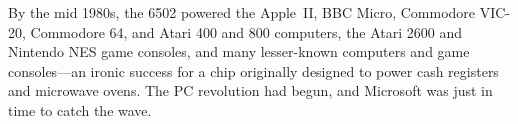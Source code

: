 By the mid 1980s, the 6502 powered the
Apple~II, BBC Micro, Commodore VIC-20, Commodore 64, and Atari 400 and
800 computers, the Atari 2600 and Nintendo NES game
consoles, and many lesser-known computers and game consoles---an
ironic success for a chip originally 
designed to power cash registers
and microwave ovens.
The PC revolution had begun, and Microsoft was just in
time to catch the wave.


